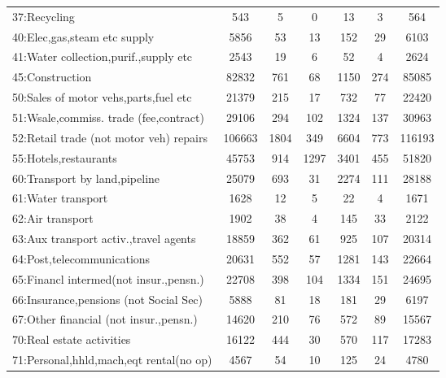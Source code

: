 {\begin{tabular}{l*{6}{c}}
37:Recycling&         543&           5&           0&          13&           3&         564\\
40:Elec,gas,steam etc supply&        5856&          53&          13&         152&          29&        6103\\
41:Water collection,purif.,supply etc&        2543&          19&           6&          52&           4&        2624\\
45:Construction&       82832&         761&          68&        1150&         274&       85085\\
50:Sales of motor vehs,parts,fuel etc&       21379&         215&          17&         732&          77&       22420\\
51:Wsale,commiss. trade (fee,contract)&       29106&         294&         102&        1324&         137&       30963\\
52:Retail trade (not motor veh) repairs&      106663&        1804&         349&        6604&         773&      116193\\
55:Hotels,restaurants&       45753&         914&        1297&        3401&         455&       51820\\
60:Transport by land,pipeline&       25079&         693&          31&        2274&         111&       28188\\
61:Water transport&        1628&          12&           5&          22&           4&        1671\\
62:Air transport&        1902&          38&           4&         145&          33&        2122\\
63:Aux transport activ.,travel agents&       18859&         362&          61&         925&         107&       20314\\
64:Post,telecommunications&       20631&         552&          57&        1281&         143&       22664\\
65:Financl intermed(not insur.,pensn.)&       22708&         398&         104&        1334&         151&       24695\\
66:Insurance,pensions (not Social Sec)&        5888&          81&          18&         181&          29&        6197\\
67:Other financial (not insur.,pensn.)&       14620&         210&          76&         572&          89&       15567\\
70:Real estate activities&       16122&         444&          30&         570&         117&       17283\\
71:Personal,hhld,mach,eqt rental(no op)&        4567&          54&          10&         125&          24&        4780\\

\end{tabular}}

